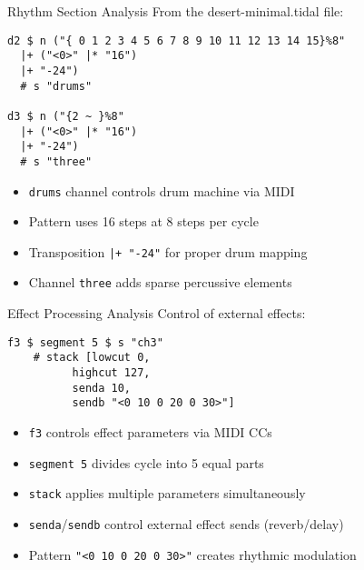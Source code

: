 \documentclass{beamer}
\begin{document}
\begin{frame}[fragile]{Rhythm Section Analysis}
From the desert-minimal.tidal file:

\begin{lstlisting}[style=tidal]
d2 $ n ("{ 0 1 2 3 4 5 6 7 8 9 10 11 12 13 14 15}%8" 	
  |+ ("<0>" |* "16")
  |+ "-24")
  # s "drums" 
 
d3 $ n ("{2 ~ }%8" 	
  |+ ("<0>" |* "16")
  |+ "-24")
  # s "three" 
\end{lstlisting}

\begin{itemize}
    \item \texttt{drums} channel controls drum machine via MIDI
    \item Pattern uses 16 steps at 8 steps per cycle
    \item Transposition \texttt{|+ "-24"} for proper drum mapping
    \item Channel \texttt{three} adds sparse percussive elements
\end{itemize}
\end{frame}

\begin{frame}[fragile]{Effect Processing Analysis}
Control of external effects:

\begin{lstlisting}[style=tidal]
f3 $ segment 5 $ s "ch3"  
    # stack [lowcut 0,
          highcut 127,
          senda 10,
          sendb "<0 10 0 20 0 30>"]
\end{lstlisting}

\begin{itemize}
    \item \texttt{f3} controls effect parameters via MIDI CCs
    \item \texttt{segment 5} divides cycle into 5 equal parts
    \item \texttt{stack} applies multiple parameters simultaneously
    \item \texttt{senda}/\texttt{sendb} control external effect sends (reverb/delay)
    \item Pattern \texttt{"<0 10 0 20 0 30>"} creates rhythmic modulation
\end{itemize}
\end{frame}
\end{document}

